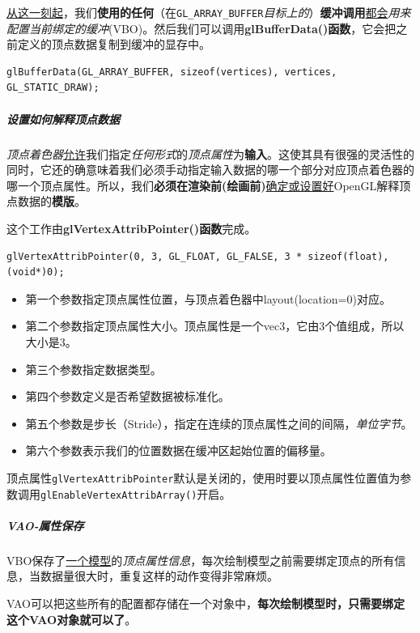 \documentclass[UTF8,a4paper,12pt]{ctexbook}
\begin{document}
					\underline{从这一刻起}，我们\textbf{使用的任何}（在\verb|GL_ARRAY_BUFFER|\textit{目标上的}）\textbf{缓冲调用}\underline{都会}\textit{用来配置当前绑定的缓冲}(VBO)。然后我们可以调用\textbf{glBufferData()函数}，它会把之前定义的顶点数据复制到缓冲的显存中。
					
					\begin{lstlisting}
glBufferData(GL_ARRAY_BUFFER, sizeof(vertices), vertices, GL_STATIC_DRAW);					
					\end{lstlisting}
								
							
				\subparagraph{设置如何解释顶点数据}
					\textit{顶点着色器}\underline{允许}我们指定\textit{任何形式}的\textit{顶点属性}为\textbf{输入}。这使其具有很强的灵活性的同时，它还的确意味着我们必须手动指定输入数据的哪一个部分对应顶点着色器的哪一个顶点属性。所以，我们\textbf{必须在渲染前(绘画前)}\underline{确定或设置好}OpenGL解释顶点数据的\textbf{模版}。	
						
					这个工作由\textbf{glVertexAttribPointer()函数}完成。	
					
					\begin{lstlisting}
glVertexAttribPointer(0, 3, GL_FLOAT, GL_FALSE, 3 * sizeof(float), (void*)0);
					\end{lstlisting}
					
					\begin{itemize}
						\item 第一个参数指定顶点属性位置，与顶点着色器中layout(location=0)对应。
						\item 第二个参数指定顶点属性大小。顶点属性是一个vec3，它由3个值组成，所以大小是3。
						\item 第三个参数指定数据类型。
						\item 第四个参数定义是否希望数据被标准化。
						\item 第五个参数是步长（Stride），指定在连续的顶点属性之间的间隔，\textit{单位字节}。
						\item 第六个参数表示我们的位置数据在缓冲区起始位置的偏移量。
					\end{itemize}
					
					顶点属性\verb|glVertexAttribPointer|默认是关闭的，使用时要以顶点属性位置值为参数调用\verb|glEnableVertexAttribArray()|开启。
					
				
				\subparagraph{VAO-属性保存}	
					VBO保存了\underline{一个模型}的\textit{顶点属性信息}，每次绘制模型之前需要绑定顶点的所有信息，当数据量很大时，重复这样的动作变得非常麻烦。
					
					VAO可以把这些所有的配置都存储在一个对象中，\textbf{每次绘制模型时，只需要绑定这个VAO对象就可以了}。
					
\end{document}
